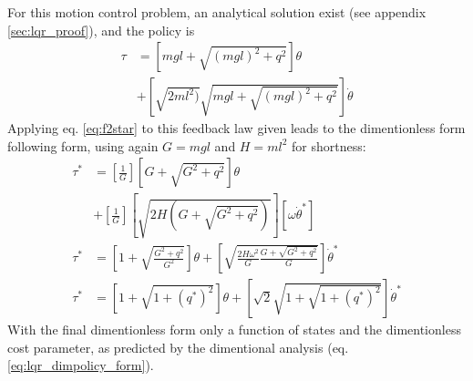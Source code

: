 For this motion control problem, an analytical solution exist (see appendix \ref{sec:lqr_proof}), and the policy is
\begin{align}
\tau &= 
\left[
mgl +
\sqrt{ (mgl)^2 + q^2} \right] \theta
\nonumber \\ &+
\left[
\sqrt{ 2 ml^2)} \sqrt{mgl+ \sqrt{ (mgl)^2 + q^2}}
\right] \dot{\theta}
\label{eq:lqr_policy}
\end{align}
Applying eq. \eqref{eq:f2star} to this feedback law given leads to the dimentionless form following form, using again $G=mgl$ and $H=ml^2$ for shortness:
\begin{align}
\tau^* &= \left[\frac{1}{G}\right] 
\left[ G + \sqrt{G^2+q^2}\right] \theta  \nonumber \\& + \left[\frac{1}{G}\right] \left[\sqrt{2H(G+\sqrt{G^2+q^2})}
\right] \left[\omega \dot{\theta}^*\right] \\
\tau^* &= 
\left[ 1 + \sqrt{\frac{G^2+q^2}{G^2}}\right] \theta + \left[\sqrt{\frac{2H\omega^2}{G}\frac{G+\sqrt{G^2+q^2}}{G}}
\right] \dot{\theta}^* \\
\tau^* &= 
\left[
1 + \sqrt{ 1 + (q^*)^2}
\right] \theta
+
\left[
\sqrt{2} \sqrt{ 1 + \sqrt{ 1 + (q^*)^2}}
\right] \dot{\theta}^*
\end{align}
With the final dimentionless form only a function of states and the dimentionless cost parameter, as predicted by the dimentional analysis (eq. \eqref{eq:lqr_dimpolicy_form}).

